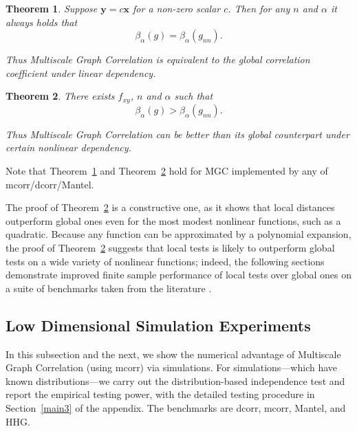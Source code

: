 \documentclass[11pt]{article}
\providecommand{\mb}[1]{\boldsymbol{#1}}
\newcommand{\jv}[1]{{\color{red}{#1}}}
\newtheorem{thm}{Theorem}
\begin{document}
\begin{thm}
\label{thm2}
Suppose $\mb{y}=c\mb{x}$ for a non-zero scalar $c$. Then for any $n$ and $\alpha$ it always holds that
\begin{equation}
\beta_{\alpha}(g) = \beta_{\alpha}(g_{nn}).
\end{equation}

Thus Multiscale Graph Correlation is equivalent to the global correlation coefficient under linear dependency.
\end{thm}

\begin{thm}
\label{thm3}
There exists $f_{xy}$, $n$ and $\alpha$ such that 
\begin{equation}
\beta_{\alpha}(g) > \beta_{\alpha}(g_{nn}).
\end{equation}

Thus Multiscale Graph Correlation can be better than its global counterpart under certain nonlinear dependency.
\end{thm}
Note that Theorem~\ref{thm2} and Theorem~\ref{thm3} hold for MGC implemented by any of mcorr/dcorr/Mantel.

The proof of Theorem~\ref{thm3} is a constructive one, as it shows that local distances outperform global ones even for the most modest nonlinear functions, such as a quadratic.  Because any function can be approximated by a polynomial expansion, the proof of Theorem~\ref{thm3} suggests that local tests is likely to outperform global tests on a wide variety of nonlinear functions; indeed, the following sections demonstrate improved finite sample performance of local tests over global ones on a suite of benchmarks taken from the literature \cite{SzekelyRizzoBakirov2007, SimonTibshirani2012, GorfineHellerHeller2012, HellerGorfine2013}.

\jv{taylor series is sufficiently standard that we can find a good citation for it :)}



\subsection{Low Dimensional Simulation Experiments}
\label{numer1}
In this subsection and the next, we show the numerical advantage of Multiscale Graph Correlation (using mcorr) via simulations. For simulations---which have known distributions---we carry out the distribution-based independence test and report the empirical testing power, with the detailed testing procedure in Section~\ref{main3} of the appendix. The benchmarks are dcorr, mcorr, Mantel, and HHG.
\end{document}
